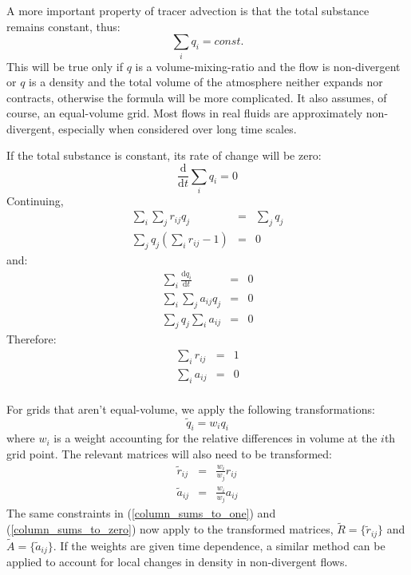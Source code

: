 \documentclass[11pt]{article}
\begin{document}
A more important property of tracer advection is that the total substance
remains constant, thus:
\begin{equation}
\sum_i q_i = const.
\label{mass_conservation}
\end{equation}
This will be true only if $q$ is a volume-mixing-ratio
and
the flow is non-divergent or
$q$ is a density and the total volume of the atmosphere neither expands
nor contracts, otherwise the formula will be more complicated.  
It also assumes, of course, an equal-volume grid.
Most flows in real fluids are approximately 
non-divergent, especially when considered over long time scales.

If the total substance is constant, its rate of change will be zero:
\begin{equation}
\frac{\mathrm d}{\mathrm d t}\sum_i q_i = 0
\end{equation}
Continuing,
\begin{eqnarray}
\sum_i \sum_j r_{ij} q_j & = & \sum_j q_j \\
\sum_j q_j \left ( \sum_i r_{ij} - 1 \right ) & = & 0
\end{eqnarray}
and:
\begin{eqnarray}
\sum_i \frac{\mathrm d q_i}{\mathrm d t} & = & 0 \\
\sum_i \sum_j a_{ij} q_j & = & 0 \\
\sum_j q_j \sum_i a_{ij} & = & 0 
\end{eqnarray}
Therefore:
\begin{eqnarray}
\sum_i r_{ij} & = & 1 
\label{column_sums_to_one}\\
\sum_i a_{ij} & = & 0
\label{column_sums_to_zero}\\
\end{eqnarray}

For grids that aren't equal-volume, we apply the following transformations:
\begin{equation}
  \tilde q_i = w_i q_i
\end{equation}
where $w_i$ is a weight accounting for the relative differences 
in volume at the $i$th grid point.
The relevant matrices will also need to be transformed:
\begin{eqnarray}
  \tilde r_{ij} & = & \frac{w_i}{w_j} r_{ij} \\
  \tilde a_{ij} & = & \frac{w_i}{w_j} a_{ij}
\end{eqnarray}
The same constraints in 
(\ref{column_sums_to_one}) and (\ref{column_sums_to_zero}) 
now apply to the transformed matrices, $\tilde R=\lbrace \tilde r_{ij} \rbrace$
and $\tilde A=\lbrace \tilde a_{ij} \rbrace$.
If the weights are given time dependence, a similar method can be
applied to account for local changes in density in non-divergent flows.
\end{document}
